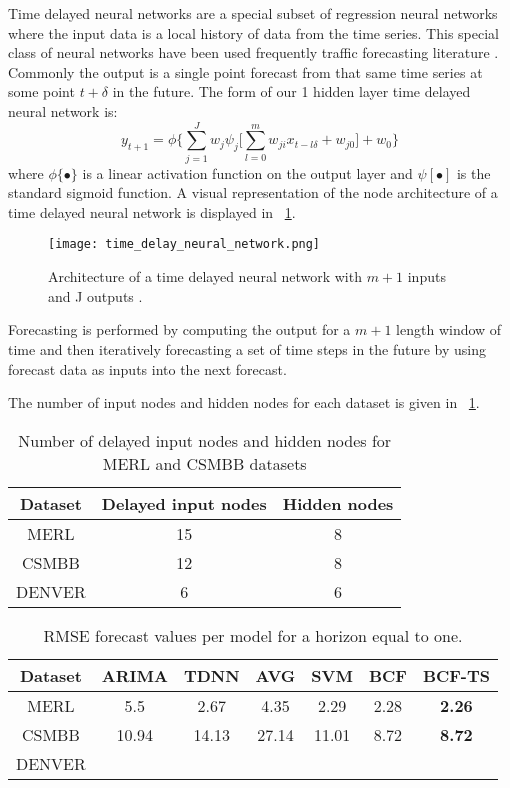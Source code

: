 Time delayed neural networks are a special subset of regression neural networks where the input data is a local history of data from the time series.  This special class of neural networks have been used frequently traffic forecasting literature \cite{Abdulhai1999, Ishak2003}.  Commonly the output is a single point forecast from that same time series at some point $t + \delta$ in the future.   The form of our 1 hidden layer time delayed neural network is:
\begin{equation}
y_{t + 1} = \phi \{ \sum_{j = 1}^{J} w_{j}\psi_{j} \bigg[ \sum_{l = 0}^{m}w_{ji}x_{t - l\delta} + w_{j0} \bigg] + w_0 \}
\end{equation}
\noindent where $\phi\{\bullet\}$ is a linear activation function on the output layer and $\psi[\bullet]$ is the standard sigmoid function.  A visual representation of the node architecture of a time delayed neural network is displayed in ~\ref{fig:tdnnarch}.

\begin{figure}[h]
	\centering
		\texttt{[image: time\_delay\_neural\_network.png]}
		\caption{Architecture of a time delayed neural network with $m + 1$ inputs and J outputs \cite{Hansen2003}.}
	\label{fig:tdnnarch}
\end{figure}

Forecasting is performed by computing the output for a $m + 1$ length window of time and then iteratively forecasting a set of time steps in the future by using forecast data as inputs into the next forecast. 

The number of input nodes and hidden nodes for each dataset is given in ~\ref{fig:tdnntab}.

\begin{table}[h]
\centering
\caption{Number of delayed input nodes and hidden nodes for MERL and CSMBB datasets}
\begin{tabular}{|c|c|c|} \hline
Dataset & Delayed input nodes & Hidden nodes\\ \hline
MERL & 15 & 8\\ \hline
CSMBB & 12 & 8\\ \hline
DENVER & 6 & 6\\ \hline
\end{tabular}
\label{fig:tdnntab}
\end{table}


\begin{table}[t!]
\centering
\caption{RMSE forecast values per model for a horizon equal to one.}
\begin{tabular}{|c|c|c|c|c|c|c|} \hline
Dataset & ARIMA & TDNN & AVG & SVM & BCF & BCF-TS\\ \hline
MERL & 5.5 & 2.67 & 4.35 & 2.29 & 2.28 & \textbf{2.26}\\ \hline
CSMBB & 10.94 & 14.13 & 27.14 & 11.01 & 8.72 & \textbf{8.72}\\ \hline
DENVER
\end{tabular}
\label{fig:rmsetab}
\end{table}


